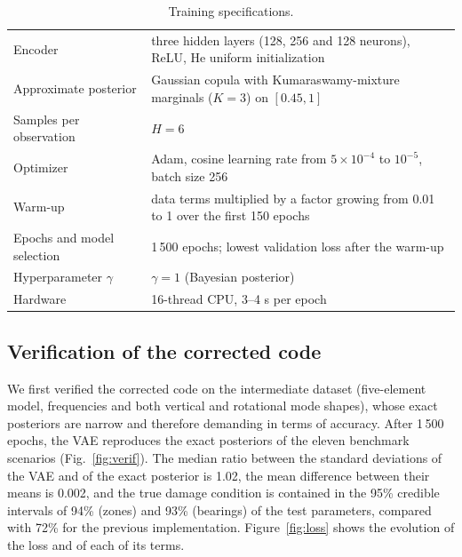 \documentclass[11pt]{article}
\begin{document}
\begin{table}[H]
\centering\small
\caption{Training specifications.}
\label{tab:training}
\begin{tabular}{p{4.2cm}p{10.6cm}}
\toprule
Encoder & three hidden layers (128, 256 and 128 neurons), ReLU, He uniform initialization \\
Approximate posterior & Gaussian copula with Kumaraswamy-mixture marginals ($K=3$) on $[0.45,1]$ \\
Samples per observation & $H=6$ \\
Optimizer & Adam, cosine learning rate from $5\times10^{-4}$ to $10^{-5}$, batch size 256 \\
Warm-up & data terms multiplied by a factor growing from 0.01 to 1 over the first 150 epochs \\
Epochs and model selection & 1\,500 epochs; lowest validation loss after the warm-up \\
Hyperparameter $\gamma$ & $\gamma=1$ (Bayesian posterior) \\
Hardware & 16-thread CPU, 3--4 s per epoch \\
\bottomrule
\end{tabular}
\end{table}

\subsection{Verification of the corrected code}

We first verified the corrected code on the intermediate dataset (five-element model, frequencies and both vertical and
rotational mode shapes), whose exact posteriors are narrow and therefore demanding in terms of accuracy. After 1\,500
epochs, the VAE reproduces the exact posteriors of the eleven benchmark scenarios (Fig.~\ref{fig:verif}). The median
ratio between the standard deviations of the VAE and of the exact posterior is 1.02, the mean difference between their
means is 0.002, and the true damage condition is contained in the 95\% credible intervals of 94\% (zones) and 93\%
(bearings) of the test parameters, compared with 72\% for the previous implementation. Figure~\ref{fig:loss} shows the
evolution of the loss and of each of its terms.
\end{document}
